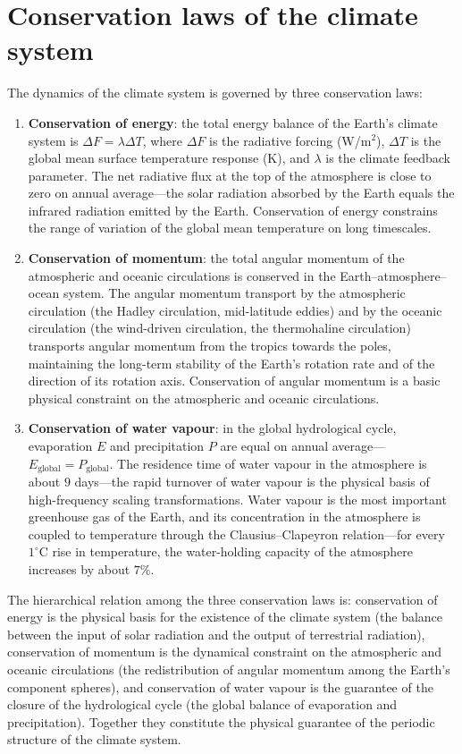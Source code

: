 \section{Conservation laws of the climate system}

\begin{theorem}\label{thm:climate_conservation}
The dynamics of the climate system is governed by three conservation laws:
\begin{enumerate}[label=(\roman*)]
    \item \textbf{Conservation of energy}: the total energy balance of the Earth's climate system is $\Delta F = \lambda \Delta T$, where $\Delta F$ is the radiative forcing (W/m$^2$), $\Delta T$ is the global mean surface temperature response (K), and $\lambda$ is the climate feedback parameter. The net radiative flux at the top of the atmosphere is close to zero on annual average---the solar radiation absorbed by the Earth equals the infrared radiation emitted by the Earth. Conservation of energy constrains the range of variation of the global mean temperature on long timescales.
    \item \textbf{Conservation of momentum}: the total angular momentum of the atmospheric and oceanic circulations is conserved in the Earth--atmosphere--ocean system. The angular momentum transport by the atmospheric circulation (the Hadley circulation, mid-latitude eddies) and by the oceanic circulation (the wind-driven circulation, the thermohaline circulation) transports angular momentum from the tropics towards the poles, maintaining the long-term stability of the Earth's rotation rate and of the direction of its rotation axis. Conservation of angular momentum is a basic physical constraint on the atmospheric and oceanic circulations.
    \item \textbf{Conservation of water vapour}: in the global hydrological cycle, evaporation $E$ and precipitation $P$ are equal on annual average---$E_{\text{global}} = P_{\text{global}}$. The residence time of water vapour in the atmosphere is about $9$ days---the rapid turnover of water vapour is the physical basis of high-frequency scaling transformations. Water vapour is the most important greenhouse gas of the Earth, and its concentration in the atmosphere is coupled to temperature through the Clausius--Clapeyron relation---for every $1^\circ$C rise in temperature, the water-holding capacity of the atmosphere increases by about $7\%$.
\end{enumerate}
The hierarchical relation among the three conservation laws is: conservation of energy is the physical basis for the existence of the climate system (the balance between the input of solar radiation and the output of terrestrial radiation), conservation of momentum is the dynamical constraint on the atmospheric and oceanic circulations (the redistribution of angular momentum among the Earth's component spheres), and conservation of water vapour is the guarantee of the closure of the hydrological cycle (the global balance of evaporation and precipitation). Together they constitute the physical guarantee of the periodic structure of the climate system.
\end{theorem}

